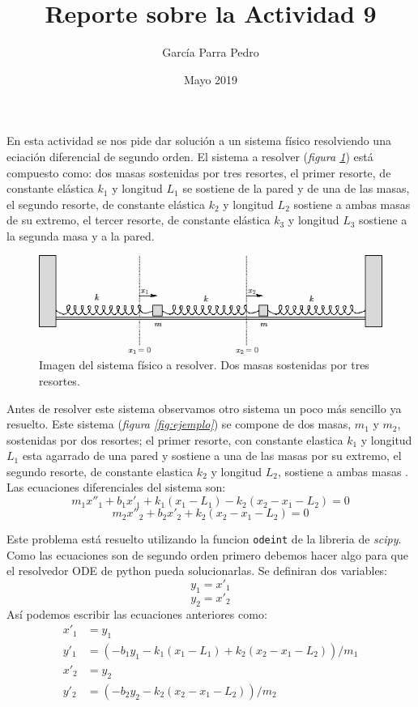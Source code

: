 \documentclass[12pt]{article}
\title{Reporte sobre la Actividad 9}
\author{García Parra Pedro}
\date{Mayo 2019}
\begin{document}
\maketitle

En esta actividad se nos pide dar soluci\'on a un sistema f\'isico resolviendo una eciaci\'on diferencial de segundo orden. El sistema a resolver (\textit{figura \ref{fig:prob}}) est\'a compuesto como: dos masas sostenidas por tres resortes, el primer resorte, de constante el\'astica $k_1$ y longitud $L_1$ se sostiene de la pared y de una de las masas, el segundo resorte, de constante el\'astica $k_2$ y longitud $L_2$ sostiene a ambas masas de su extremo, el tercer resorte, de constante el\'astica $k_3$ y longitud $L_3$ sostiene a la segunda masa y a la pared.

\begin{figure}
    \centering
    \includegraphics[scale = 0.7]{problema.png}
    \caption{Imagen del sistema f\'isico a resolver. Dos masas sostenidas por tres resortes.}
    \label{fig:prob}
\end{figure}

Antes de resolver este sistema observamos otro sistema un poco m\'as sencillo ya resuelto.
Este sistema (\textit{figura \ref{fig:ejemplo}}) se compone de dos masas, $m_1$ y $m_2$, sostenidas por dos resortes; el primer resorte, con constante elastica $k_1$ y longitud $L_1$ esta agarrado de una pared y sostiene a una de las masas por su extremo, el segundo resorte, de constante elastica $k_2$ y longitud $L_2$, sostiene a ambas masas . Las ecuaciones diferenciales del sistema son:
$$ m_1x''_1+b_1x'_1+k_1(x_1-L_1)-k_2(x_2-x_1-L_2)=0 $$
$$ m_2x''_2+b_2x'_2+k_2(x_2-x_1-L_2)=0 $$

Este problema est\'a resuelto utilizando la funcion \texttt{odeint} de la libreria de \textit{scipy}.
Como las ecuaciones son de segundo orden primero debemos hacer algo para que el resolvedor ODE de python pueda solucionarlas.
Se definiran dos variables:
$$ y_1 = x'_1 $$
$$ y_2 = x'_2 $$
As\'i podemos escribir las ecuaciones anteriores como:
\begin{equation*}
    \begin{split}
        x'_1&=y_1 \\
        y'_1&=(-b_1y_1-k_1(x_1-L_1)+k_2(x_2-x_1-L_2))/m_1\\
        x'_2&=y_2\\
        y'_2&=(-b_2y_2-k_2(x_2-x_1-L_2))/m_2
    \end{split}
\end{equation*}
\end{document}
